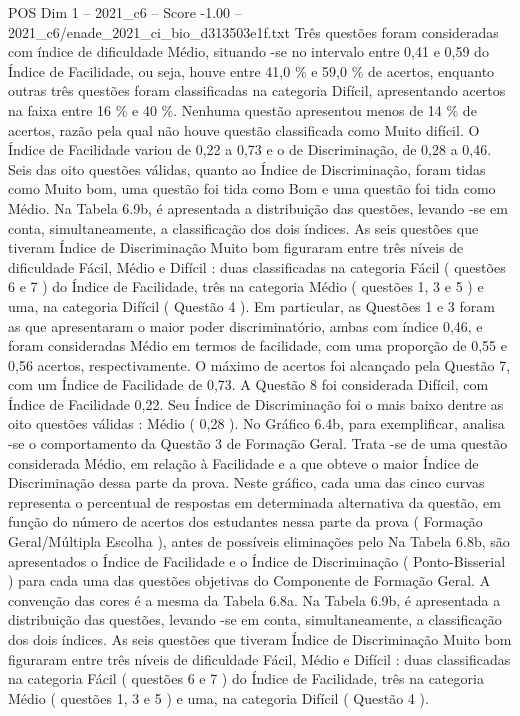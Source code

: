 \begin{textsample}{POS Dim 1 – 2021\_c6 – Score -1.00 – 2021\_c6/enade\_2021\_ci\_bio\_d313503e1f.txt}
Três questões foram consideradas com índice de dificuldade Médio, situando -se no intervalo entre 0,41 e 0,59 do Índice de Facilidade, ou seja, houve entre 41,0 \% e 59,0 \% de acertos, enquanto outras três questões foram classificadas na categoria Difícil, apresentando acertos na faixa entre 16 \% e 40 \%.
Nenhuma questão apresentou menos de 14 \% de acertos, razão pela qual não houve questão classificada como Muito difícil.
O Índice de Facilidade variou de 0,22 a 0,73 e o de Discriminação, de 0,28 a 0,46.
Seis das oito questões válidas, quanto ao Índice de Discriminação, foram tidas como Muito bom, uma questão foi tida como Bom e uma questão foi tida como Médio.
Na Tabela 6.9b, é apresentada a distribuição das questões, levando -se em conta, simultaneamente, a classificação dos dois índices.
As seis questões que tiveram Índice de Discriminação Muito bom figuraram entre três níveis de dificuldade Fácil, Médio e Difícil : duas classificadas na categoria Fácil ( questões 6 e 7 ) do Índice de Facilidade, três na categoria Médio ( questões 1, 3 e 5 ) e uma, na categoria Difícil ( Questão 4 ).
Em particular, as Questões 1 e 3 foram as que apresentaram o maior poder discriminatório, ambas com índice 0,46, e foram consideradas Médio em termos de facilidade, com uma proporção de 0,55 e 0,56 acertos, respectivamente.
O máximo de acertos foi alcançado pela Questão 7, com um Índice de Facilidade de 0,73.
A Questão 8 foi considerada Difícil, com Índice de Facilidade 0,22.
Seu Índice de Discriminação foi o mais baixo dentre as oito questões válidas : Médio ( 0,28 ).
No Gráfico 6.4b, para exemplificar, analisa -se o comportamento da Questão 3 de Formação Geral.
Trata -se de uma questão considerada Médio, em relação à Facilidade e a que obteve o maior Índice de Discriminação dessa parte da prova.
Neste gráfico, cada uma das cinco curvas representa o percentual de respostas em determinada alternativa da questão, em função do número de acertos dos estudantes nessa parte da prova ( Formação Geral/Múltipla Escolha ), antes de possíveis eliminações pelo Na Tabela 6.8b, são apresentados o Índice de Facilidade e o Índice de Discriminação ( Ponto-Bisserial ) para cada uma das questões objetivas do Componente de Formação Geral.
A convenção das cores é a mesma da Tabela 6.8a.
Na Tabela 6.9b, é apresentada a distribuição das questões, levando -se em conta, simultaneamente, a classificação dos dois índices.
As seis questões que tiveram Índice de Discriminação Muito bom figuraram entre três níveis de dificuldade Fácil, Médio e Difícil : duas classificadas na categoria Fácil ( questões 6 e 7 ) do Índice de Facilidade, três na categoria Médio ( questões 1, 3 e 5 ) e uma, na categoria Difícil ( Questão 4 ).

\end{textsample}
